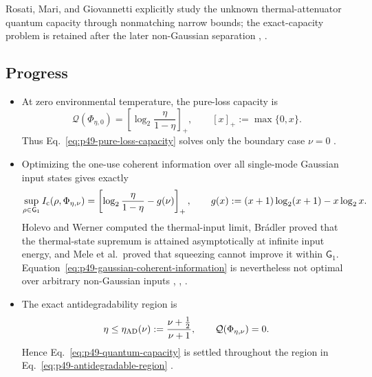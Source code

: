 Rosati, Mari, and Giovannetti explicitly study the unknown thermal-attenuator
quantum capacity through nonmatching narrow bounds; the exact-capacity
problem is retained after the later non-Gaussian separation
,
.

\subsection*{Progress}

\begin{itemize}
  \item At zero environmental temperature, the pure-loss capacity is
  \begin{equation}
    \mathcal Q(\Phi_{\eta,0})
    =\left[\log_2\frac{\eta}{1-\eta}\right]_+,
    \qquad [x]_+:=\max\{0,x\}.
    \label{eq:p49-pure-loss-capacity}
  \end{equation}
  Thus Eq.~\eqref{eq:p49-pure-loss-capacity} solves only the boundary case
  $\nu=0$ .

  \item Optimizing the one-use coherent information over all single-mode
  Gaussian input states gives exactly
  \begin{equation}
    \sup_{\rho\in\mathsf G_1}I_{\rm c}(\rho,\Phi_{\eta,\nu})
    =\left[\log_2\frac{\eta}{1-\eta}-g(\nu)\right]_+,
    \qquad
    g(x):=(x+1)\log_2(x+1)-x\log_2x.
    \label{eq:p49-gaussian-coherent-information}
  \end{equation}
  Holevo and Werner computed the thermal-input limit, Br\'adler proved that
  the thermal-state supremum is attained asymptotically at infinite input
  energy, and Mele et al.\ proved that squeezing cannot improve it within
  $\mathsf G_1$.  Equation~\eqref{eq:p49-gaussian-coherent-information} is
  nevertheless not optimal over arbitrary non-Gaussian inputs
  ,
  ,
  .

  \item The exact antidegradability region is
  \begin{equation}
    \eta\leq\eta_{\rm AD}(\nu):=
    \frac{\nu+\frac12}{\nu+1},
    \qquad \mathcal Q(\Phi_{\eta,\nu})=0.
    \label{eq:p49-antidegradable-region}
  \end{equation}
  Hence Eq.~\eqref{eq:p49-quantum-capacity} is settled throughout the region
  in Eq.~\eqref{eq:p49-antidegradable-region}
  .


\end{itemize}
